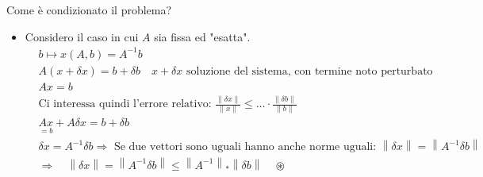 \documentclass{article}
\begin{document}
Come è condizionato il problema?
\begin{itemize}
    \item Considero il caso in cui $A$ sia fissa ed "esatta".
          \begin{align*}
               & b\mapsto x(A,b)=A^{-1}b                                                                                                                               \\
               & A(x+\delta x)=b+\delta b\quad x+\delta x\text{ soluzione del sistema, con termine noto perturbato}                                                    \\
               & Ax=b                                                                                                                                                  \\
               & \text{Ci interessa quindi l'errore relativo: }\frac{\|\delta x\|}{\|x\|}\le \dots\cdot\frac{\|\delta b\|}{\|b\|}                                      \\
               & \underset{=b}{Ax}+A\delta x=b+\delta b                                                                                                                \\
               & \delta x=A^{-1}\delta b\Rightarrow \text{ Se due vettori sono uguali hanno anche norme uguali: }\left\|\delta x\right\|=\left\|A^{-1}\delta b\right\| \\
               & \Rightarrow\quad\left\|\delta x\right\|=\left\|A^{-1}\delta b\right\|\le\left\|A^{-1}\right\|_*\left\|\delta b\right\|\quad\circledast
          \end{align*}


\end{itemize}
\end{document}
